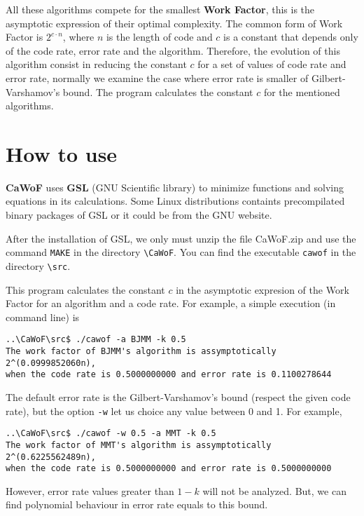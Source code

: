 \documentclass[a4paper]{book}
\begin{document}
All these algorithms compete for the smallest \textbf{Work Factor}, this is the asymptotic expression of their optimal complexity. The common form of Work Factor is $2^{c\cdot n}$, where $n$ is the length of code and $c$ is a constant that depends only of the code rate, error rate and the algorithm. Therefore, the evolution of this algorithm consist in reducing the constant $c$ for a set of values of code rate and error rate, normally we examine the case where error rate is smaller of Gilbert-Varshamov's bound. The program calculates the constant $c$ for the mentioned algorithms. 

\section{How to use}

\textbf{CaWoF} uses \textbf{GSL} (GNU Scientific library) to minimize functions and solving equations in its calculations. Some Linux distributions containts precompilated binary packages of GSL or it could be from the GNU website. 

After the installation of GSL, we only must unzip the file CaWoF.zip and use the command \texttt{MAKE} in the directory \verb+\CaWoF+. You can find the executable \texttt{cawof} in the directory \verb+\src+. 

This program calculates the constant $c$ in the asymptotic expresion of the Work Factor for an algorithm and a code rate. For example, a simple execution (in command line) is
{\footnotesize
\begin{verbatim}..\CaWoF\src$ ./cawof -a BJMM -k 0.5
The work factor of BJMM's algorithm is assymptotically 2^(0.0999852060n),
when the code rate is 0.5000000000 and error rate is 0.1100278644
\end{verbatim}
}

The default error rate is the Gilbert-Varshamov's bound (respect the given code rate), but the option \verb+-w+ let us choice any value between 0 and 1. For example, 

{\footnotesize
\begin{verbatim}..\CaWoF\src$ ./cawof -w 0.5 -a MMT -k 0.5
The work factor of MMT's algorithm is assymptotically 2^(0.6225562489n),
when the code rate is 0.5000000000 and error rate is 0.5000000000
\end{verbatim}
}

However, error rate values greater than $1-k$ will not be analyzed. But, we can find polynomial behaviour in error rate equals to this bound.
\end{document}
